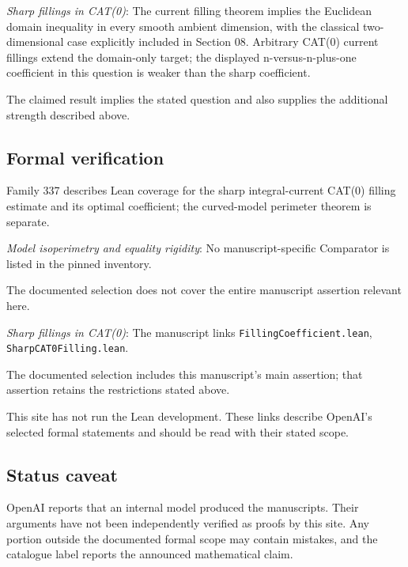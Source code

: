 \documentclass[11pt]{article}
\begin{document}
\textit{Sharp fillings in CAT(0)}: The current filling theorem implies the Euclidean domain inequality in every smooth ambient dimension, with the classical two-dimensional case explicitly included in Section 08. Arbitrary CAT(0) current fillings extend the domain-only target; the displayed n-versus-n-plus-one coefficient in this question is weaker than the sharp coefficient.

The claimed result implies the stated question and also supplies the additional strength described above.

\subsection{Formal verification}
Family 337 describes Lean coverage for the sharp integral-current CAT(0) filling estimate and its optimal coefficient; the curved-model perimeter theorem is separate.

\textit{Model isoperimetry and equality rigidity}: No manuscript-specific Comparator is listed in the pinned inventory.

The documented selection does not cover the entire manuscript assertion relevant here.

\textit{Sharp fillings in CAT(0)}: The manuscript links \texttt{FillingCoefficient.lean}, \texttt{SharpCAT0Filling.lean}.

The documented selection includes this manuscript’s main assertion; that assertion retains the restrictions stated above.

This site has not run the Lean development. These links describe OpenAI’s selected formal statements and should be read with their stated scope.

\subsection{Status caveat}
OpenAI reports that an internal model produced the manuscripts. Their arguments have not been independently verified as proofs by this site. Any portion outside the documented formal scope may contain mistakes, and the catalogue label reports the announced mathematical claim.
\end{document}
